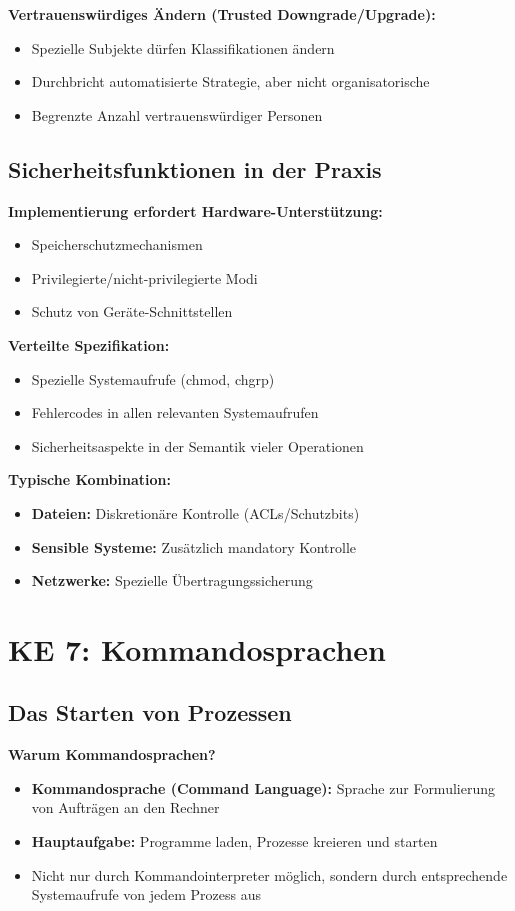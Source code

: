 \documentclass[9pt,a4paper]{extarticle}
\begin{document}
\begin{multicols*}{2}
\textbf{Vertrauenswürdiges Ändern (Trusted Downgrade/Upgrade):}
\begin{itemize}
\item Spezielle Subjekte dürfen Klassifikationen ändern
\item Durchbricht automatisierte Strategie, aber nicht organisatorische
\item Begrenzte Anzahl vertrauenswürdiger Personen
\end{itemize}

\subsection{Sicherheitsfunktionen in der Praxis}
\textbf{Implementierung erfordert Hardware-Unterstützung:}
\begin{itemize}
\item Speicherschutzmechanismen
\item Privilegierte/nicht-privilegierte Modi
\item Schutz von Geräte-Schnittstellen
\end{itemize}

\textbf{Verteilte Spezifikation:}
\begin{itemize}
\item Spezielle Systemaufrufe (chmod, chgrp)
\item Fehlercodes in allen relevanten Systemaufrufen
\item Sicherheitsaspekte in der Semantik vieler Operationen
\end{itemize}

\textbf{Typische Kombination:}
\begin{itemize}
\item \textbf{Dateien:} Diskretionäre Kontrolle (ACLs/Schutzbits)
\item \textbf{Sensible Systeme:} Zusätzlich mandatory Kontrolle
\item \textbf{Netzwerke:} Spezielle Übertragungssicherung
\end{itemize}

\section{KE 7: Kommandosprachen}

\subsection{Das Starten von Prozessen}
\textbf{Warum Kommandosprachen?}
\begin{itemize}
\item \textbf{Kommandosprache (Command Language):} Sprache zur Formulierung von Aufträgen an den Rechner
\item \textbf{Hauptaufgabe:} Programme laden, Prozesse kreieren und starten
\item Nicht nur durch Kommandointerpreter möglich, sondern durch entsprechende Systemaufrufe von jedem Prozess aus
\end{itemize}


\end{multicols*}
\end{document}
